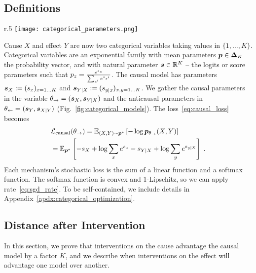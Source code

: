\subsection{Definitions}
\begin{wrapfigure}[10]{r}{.5\textwidth} 
    \centering
    \texttt{[image: categorical\_parameters.png]}
    \caption{Parametrization of causal (blue) and anticausal (red) categorical models}
    \label{fig:categorical_models}
\end{wrapfigure}
Cause $X$ and effect $Y$ are now two categorical variables taking values in $\{1, \dots, K\}$.
Categorical variables are an exponential family with mean parameters $\vp\in\simplex_K$ the probability vector, and with natural parameter $\vs\in\real^K$ -- the logits or score parameters such that $\evp_z = \frac{e^{\evs_z}}{\sum_{z'} e^{\evs_{z'}}}$.
The causal model has parameters $\vs_X := (\evs_x)_{x=1\dots K}$ 
and $\vs_{Y|X} := (\evs_{y|x})_{x,y=1\dots K}$. 
We gather the causal parameters in the variable $\causalvar = (\vs_X, \vs_{Y|X})$ and the anticausal parameters in $\antivar = (\vs_Y, \vs_{X|Y})$ (Fig.~\ref{fig:categorical_models}).
The loss~\eqref{eq:causal_loss} becomes
\begin{align}
    &\cL_\text{causal}(\causalvar) 
    = \expect[(X,Y)\sim\ptransfer]{-\log \pmodel(X, Y)}\\
    &= \expect[\ptransfer]{- \evs_X + \log\sum_{x} e^{s_{x}} 
    - \evs_{Y|X} + \log\sum_y e^{s_{y|X}}}
    \; . \nonumber
\end{align}
Each mechanism's stochastic loss is the sum of a linear function and a softmax function.
The softmax function is convex and 1-Lipschitz, so we can apply rate~\eqref{eq:sgd_rate}. 
To be self-contained, we include details in Appendix~\ref{apdx:categorical_optimization}.

\subsection{Distance after Intervention}
\label{ssec:categorical_intervention_cause}
In this section, we prove that interventions on the cause advantage the causal model by a factor $K$, and we describe when interventions on the effect will advantage one model over another.

